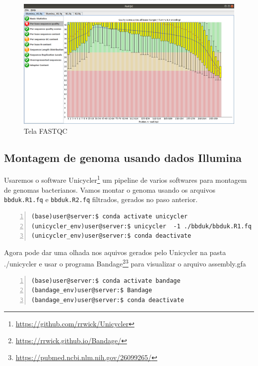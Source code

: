 \documentclass[letter,11pt]{book}
\begin{document}
\begin{figure}[h!]
\centering
 \includegraphics[width=12cm]{Figs/fastqc.png}
 \caption{\label{fig:fastqc}Tela FASTQC}
\end{figure}

\subsection{Montagem de genoma usando dados Illumina}
Usaremos o software Unicycler\footnote{\url{https://github.com/rrwick/Unicycler}} um pipeline de varios softwares para montagem de genomas bacterianos. Vamos montar o genoma usando os arquivos \Verb+bbduk.R1.fq+ e \Verb+bbduk.R2.fq+ filtrados, gerados no paso anterior.

\begin{Verbatim}[commandchars=!\{\}, numbers=left,label= Montando leituras com Unicycler,frame=topline,fontsize=\scriptsize]
(base)user@server:$ conda activate unicycler
(unicycler_env)user@server:$ unicycler  -1 ./bbduk/bbduk.R1.fq -2 ./bbduk/bbduk.R2.fq -o ./unicycler/
(unicycler_env)user@server:$ conda deactivate
\end{Verbatim}

Agora pode dar uma olhada nos aquivos gerados pelo Unicycler na pasta ./unicycler e usar o programa Bandage\footnote{\url{https://rrwick.github.io/Bandage/}}\footnote{\url{https://pubmed.ncbi.nlm.nih.gov/26099265/}} para visualizar o arquivo assembly.gfa


\begin{Verbatim}[commandchars=!\{\}, numbers=left,label= Abrindo o Bandage,frame=topline,fontsize=\scriptsize]
(base)user@server:$ conda activate bandage 
(bandage_env)user@server:$ Bandage
(bandage_env)user@server:$ conda deactivate
\end{Verbatim}
\end{document}

